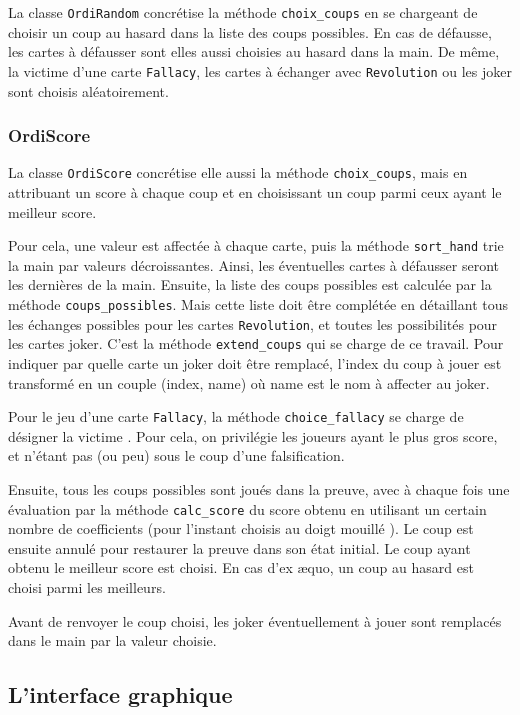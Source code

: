 \documentclass[12pt, a4paper]{article}
\begin{document}
La classe \texttt{OrdiRandom} concrétise la méthode \texttt{choix\_coups} en se chargeant de choisir un coup au hasard dans la liste des coups possibles. En cas de défausse, les cartes à défausser sont elles aussi choisies au hasard dans la main. De même, la \og victime \fg d'une carte \texttt{Fallacy}, les cartes à échanger avec \texttt{Revolution} ou les joker sont choisis aléatoirement.

\subsubsection{OrdiScore}

La classe \texttt{OrdiScore} concrétise elle aussi la méthode \texttt{choix\_coups}, mais en attribuant un score à chaque coup et en choisissant un coup parmi ceux ayant le meilleur score.

Pour cela, une valeur est affectée à chaque carte, puis la méthode \texttt{sort\_hand} trie la main par valeurs décroissantes. Ainsi, les éventuelles cartes à défausser seront les dernières de la main. Ensuite, la liste des coups possibles est calculée par la méthode \texttt{coups\_possibles}. Mais cette liste doit être complétée en détaillant tous les échanges possibles pour les cartes \texttt{Revolution}, et toutes les possibilités pour les cartes joker. C'est la méthode \texttt{extend\_coups} qui se charge de ce travail. Pour indiquer par quelle carte un joker doit être remplacé, l'index du coup à jouer est transformé en un couple (index, name) où name est le nom à affecter au joker.

Pour le jeu d'une carte \texttt{Fallacy}, la méthode \texttt{choice\_fallacy} se charge de désigner la \og victime \fg. Pour cela, on privilégie les joueurs ayant le plus gros score, et n'étant pas (ou peu) sous le coup d'une falsification.

Ensuite, tous les coups possibles sont joués dans la preuve, avec à chaque fois une évaluation par la méthode \texttt{calc\_score} du score obtenu en utilisant un certain nombre de coefficients (pour l'instant choisis au \og doigt mouillé \fg). Le coup est ensuite annulé pour restaurer la preuve dans son état initial. Le coup ayant obtenu le meilleur score est choisi. En cas d'ex \ae quo, un coup au hasard est choisi parmi les meilleurs.

Avant de renvoyer le coup choisi, les joker éventuellement à jouer sont remplacés dans le main par la valeur choisie.

\subsection{L'interface graphique}
\end{document}
